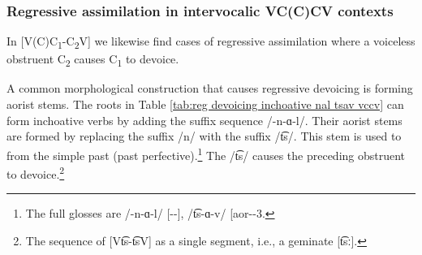   	\subsubsection{Regressive assimilation in intervocalic VC(C)CV contexts}\label{section:segmentalPhono:allphonLaryng:assiimlation:regIntervoc}
  	
  	In [V(C)C\textsubscript{1}-C\textsubscript{2}V] we likewise find cases of regressive assimilation where a voiceless obstruent C\textsubscript{2} causes C\textsubscript{1} to devoice. 
  	
  	A common morphological construction that causes regressive devoicing is forming aorist stems. The roots in Table \ref{tab:reg devoicing inchoative nal tsav vccv} can form inchoative verbs by adding the suffix sequence /-n-ɑ-l/. Their aorist stems are formed by replacing the suffix /n/ with the suffix /t͡s/. This stem is used to from the simple past (past perfective).\footnote{The full glosses are /-n-ɑ-l/ [{\inch}-{\thgloss}-{\infgloss}], /t͡s-ɑ-v/ [{aor}-{\pst}-3{\sg}. } The /t͡s/ causes the preceding obstruent to devoice.\footnote{The sequence of [Vt͡s-t͡sV] as a single segment, i.e., a geminate [t͡sː]. }
  	
